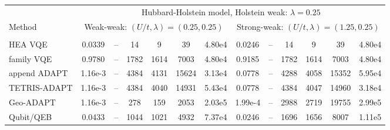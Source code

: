 \documentclass[
  reprint,
  amsmath,
  amssymb,
  aps,
  pra,
  nofootinbib,
  superscriptaddress,
  floatfix
]{revtex4-2}
\newcommand{\metrichead}[1]{\makebox[0.061\textwidth][c]{#1}}
\begin{document}
\begin{widetext}
\begin{minipage}{\textwidth}
\begin{center}
\footnotesize
\setlength{\tabcolsep}{1.15pt}
\renewcommand{\arraystretch}{1.08}
\begin{ruledtabular}
\begin{tabular}{p{}cccccc|cccccc}
& \multicolumn{12}{c}{Hubbard-Holstein model, Holstein weak: $\lambda=0.25$}\\
\cline{2-13}
Method & \multicolumn{6}{c|}{Weak-weak: $(U/t,\lambda)=(0.25,0.25)$} & \multicolumn{6}{c}{Strong-weak: $(U/t,\lambda)=(1.25,0.25)$}\\
\cline{2-7}\cline{8-13}
 & \metrichead{$\Delta E$} & \metrichead{$1-F$} & \metrichead{$N_{2q}$} & \metrichead{$D_{2q}$} & \metrichead{$D_c$} & \metrichead{$S$} & \metrichead{$\Delta E$} & \metrichead{$1-F$} & \metrichead{$N_{2q}$} & \metrichead{$D_{2q}$} & \metrichead{$D_c$} & \metrichead{$S$}\\
\colrule
HEA VQE & 0.0339 & -- & 14 & 9 & 39 & 4.80e4 & 0.0246 & -- & 14 & 9 & 39 & 4.80e4\\
family VQE & 0.9780 & -- & 1782 & 1614 & 7003 & 4.80e4 & 0.9185 & -- & 1782 & 1614 & 7003 & 4.80e4\\
append ADAPT & 1.16e-3 & -- & 4384 & 4131 & 15624 & 3.13e4 & 0.0778 & -- & 4288 & 4058 & 15352 & 5.95e4\\
TETRIS-ADAPT & 1.16e-3 & -- & 4384 & 4040 & 14931 & 5.43e4 & 0.0778 & -- & 4384 & 4047 & 14960 & 3.18e4\\
Geo-ADAPT & 1.16e-3 & -- & 278 & 159 & 2053 & 2.03e5 & 1.99e-4 & -- & 2988 & 2719 & 19755 & 2.99e5\\
Qubit/QEB & 0.0433 & -- & 1044 & 1021 & 4932 & 7.37e4 & 0.0246 & -- & 1696 & 1656 & 8007 & 1.11e5\\

\end{tabular}
\end{ruledtabular}
\end{center}
\end{minipage}
\end{widetext}
\end{document}
